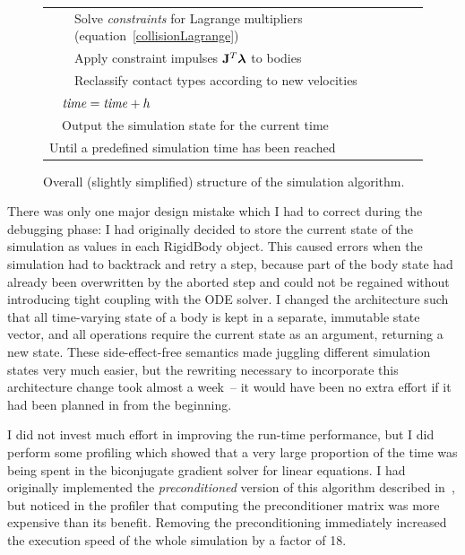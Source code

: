 \begin{figure}
\begin{tabular}{|l|l|l|l|@{}l}
        &&\multicolumn{2}{|l|}{Solve \textit{constraints} for Lagrange multipliers
        (equation~\ref{collisionLagrange})}&
        \curly{\ref{collidingContact}}{\spx\spx\spx\spx\spx}\\\cline{3-4}
        &&\multicolumn{2}{|l|}{Apply constraint impulses $\m{J}^T\ve{\lambda}$ to bodies}\\\cline{3-4}
        &&\multicolumn{2}{|l|}{Reclassify contact types according to new velocities}\\\cline{2-4}
    &\multicolumn{3}{|l|}{$\mbox{\textit{time}} = \mbox{\textit{time}} + h$}\\\cline{2-4}
    &\multicolumn{3}{|l|}{Output the simulation state for the current time}\\\cline{2-4}
\multicolumn{4}{|l|}{Until a predefined simulation time has been reached}\\\cline{1-4}
\end{tabular}
\caption{Overall (slightly simplified) structure of the simulation algorithm.\label{flowchart}}
\end{figure}

There was only one major design mistake which I had to correct during the debugging phase: I had
originally decided to store the current state of the simulation as values in each
\textsf{RigidBody} object. This caused errors when the simulation had to backtrack and retry a
step, because part of the body state had already been overwritten by the aborted step and could
not be regained without introducing tight coupling with the ODE solver. I changed the architecture
such that all time-varying state of a body is kept in a separate, immutable state vector, and all
operations require the current state as an argument, returning a new state. These side-effect-free
semantics made juggling different simulation states very much easier, but the rewriting necessary
to incorporate this architecture change took almost a week~-- it would have been no extra effort
if it had been planned in from the beginning.

I did not invest much effort in improving the run-time performance, but I did perform some
profiling which showed that a very large proportion of the time was being spent in the biconjugate
gradient solver for linear equations. I had originally implemented the \emph{preconditioned}
version of this algorithm described in~\cite{NRinC}, but noticed in the profiler that computing
the preconditioner matrix was more expensive than its benefit. Removing the preconditioning
immediately increased the execution speed of the whole simulation by a factor of 18.


